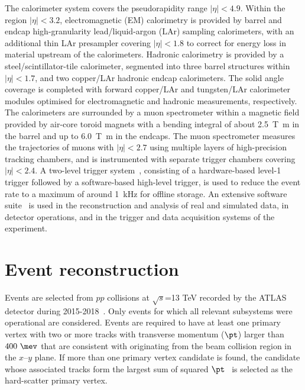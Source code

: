\documentclass[PAPER, coverpage, atlasdraft=true, texlive=2016, UKenglish]{\ATLASLATEXPATH atlasdoc} %
\begin{document}
The calorimeter system covers the pseudorapidity range $|\eta| < 4.9$. Within the region $|\eta|< 3.2$, electromagnetic (EM) calorimetry is provided by barrel and endcap high-granularity lead/liquid-argon (LAr) sampling calorimeters, with an additional thin LAr presampler covering $|\eta| < 1.8$ to correct for energy loss in material upstream of the calorimeters. Hadronic calorimetry is provided by %
a steel/scintillator-tile calorimeter, segmented into three barrel structures within $|\eta| < 1.7$, and two copper/LAr hadronic endcap calorimeters.
The solid angle coverage is completed with forward copper/LAr and tungsten/LAr calorimeter modules optimised for electromagnetic and hadronic measurements, respectively.
The calorimeters are surrounded by a muon spectrometer within a magnetic field provided by air-core toroid magnets with a bending integral of about \SI{2.5}{\tesla\metre} in the barrel and up to \SI{6.0}{\tesla\metre} in the endcaps. 
The muon spectrometer measures the trajectories of muons with $|\eta|<2.7$ using multiple layers of high-precision tracking chambers, and is instrumented with separate trigger chambers covering $|\eta|<2.4$. A two-level trigger system~\cite{Aaboud:2016leb}, consisting of a hardware-based level-1 trigger followed by a software-based high-level trigger, is used to reduce the event rate to a maximum of around \SI{1}{\kHz} for offline storage.
An extensive software suite~\cite{ATL-SOFT-PUB-2021-001} is used in the reconstruction and analysis of real and simulated data, in detector operations, and in the trigger and data acquisition systems of the experiment.


\section{Event reconstruction}
\label{sec:objects}

Events are selected from $pp$ collisions at $\sqrt{s}$=13 TeV recorded by the ATLAS detector during 2015-2018~\cite{DAPR-2018-01}.
Only events for which all relevant subsystems were operational are considered.
Events are required to have at least one primary vertex with two or more tracks with transverse momentum
($\pt$) larger than $400~\mev$ that are consistent with originating from the 
beam collision region in the $x$--$y$ plane. If more than one primary vertex candidate is found, the
candidate whose associated tracks form the largest sum of squared $\pt$~\cite{ATL-PHYS-PUB-2015-026}
is selected as the hard-scatter primary vertex.
\end{document}
